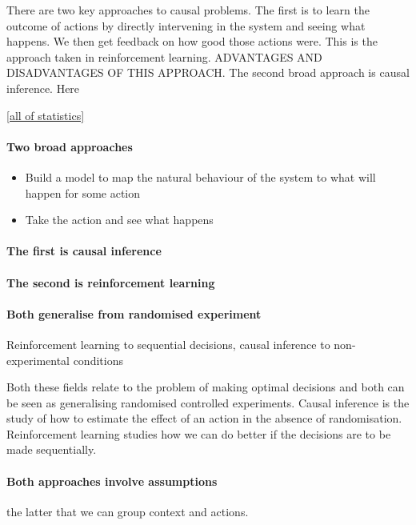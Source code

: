 \documentclass[11pt,a4paper,oneside]{book}
\theoremstyle{plain}
\theoremstyle{definition}
\begin{document}
There are two key approaches to causal problems. The first is to learn the outcome of actions by directly intervening in the system and seeing what happens. We then get feedback on how good those actions were. This is the approach taken in reinforcement learning. ADVANTAGES AND DISADVANTAGES OF THIS APPROACH. The second broad approach is causal inference. Here

\ref{all of statistics}

\paragraph*{Two broad approaches} 
\begin{itemize}
\item Build a model to map the natural behaviour of the system to what will happen for some action
\item Take the action and see what happens
\end{itemize}

\paragraph*{The first is causal inference}

\paragraph*{The second is reinforcement learning}

\paragraph*{Both generalise from randomised experiment} Reinforcement learning to sequential decisions, causal inference to non-experimental conditions

Both these fields relate to the problem of making optimal decisions and both can be seen as generalising randomised controlled experiments. Causal inference  is the study of how to estimate the effect of an action in the absence of randomisation. Reinforcement learning studies how we can do better if the decisions are to be made sequentially. 

\paragraph*{Both approaches involve assumptions} the latter that we can group context and actions.
\end{document}
